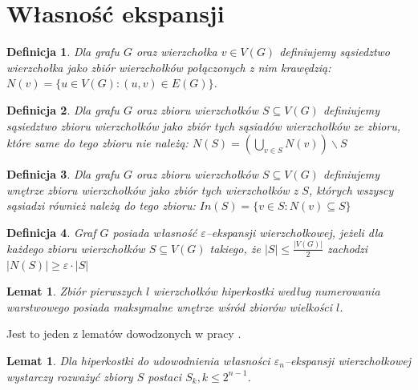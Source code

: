 \documentclass{pracamgr}
\newtheorem{defi}{Definicja}[section]
\newtheorem{lemma}[theorem]{Lemat}
\begin{document}
  
  
  \section{Własność ekspansji}
  
   \begin{defi}\label{sasiedztwo wierzcholka}
    Dla grafu $G$ oraz wierzchołka $v\in V(G)$ definiujemy \emph{sąsiedztwo wierzchołka} jako zbiór wierzchołków połączonych z nim krawędzią:
    $N(v)=\{u\in V(G):(u,v)\in E(G)\}$.
   \end{defi}
   \begin{defi}\label{sasiedztwo zbioru wierzcholkow}%
    Dla grafu $G$ oraz zbioru wierzchołków $S\subseteq V(G)$ definiujemy \emph{sąsiedztwo zbioru wierzchołków} jako zbiór tych sąsiadów wierzchołków ze zbioru,
    które same do tego zbioru nie należą: $N(S)=(\bigcup_{v\in S}N(v))\backslash S$
   \end{defi}
   \begin{defi}\label{wnetrze zbioru wierzcholkow}
    Dla grafu $G$ oraz zbioru wierzchołków $S\subseteq V(G)$ definiujemy \emph{wnętrze zbioru wierzchołków} jako zbiór tych wierzchołków z $S$,
    których wszyscy sąsiadzi również należą do tego zbioru: $In(S)=\{v\in S:N(v)\subseteq S\}$
   \end{defi}
   \begin{defi}\label{epsilon ekspansja wierzcholkowa}
    Graf $G$ posiada własność \emph{$\varepsilon$--ekspansji wierzchołkowej}, jeżeli dla każdego zbioru wierzchołków $S\subseteq V(G)$ takiego,
    że $|S|\le\frac{|V(G)|}{2}$ zachodzi $|N(S)|\ge\varepsilon\cdot|S|$
   \end{defi}
   \begin{lemma}
    Zbiór pierwszych $l$ wierzchołków hiperkostki według numerowania warstwowego posiada maksymalne wnętrze wśród zbiorów wielkości $l$.  
   \end{lemma}\label{HAR1}
   Jest to jeden z lematów dowodzonych w pracy \cite{HAR}.
   \begin{lemma}\label{S->S_k}%
    Dla hiperkostki do udowodnienia własności $\varepsilon_n$--ekspansji wierzchołkowej wystarczy rozważyć zbiory $S$ postaci $S_k,k\le 2^{n-1}$.
   \end{lemma}
\end{document}
